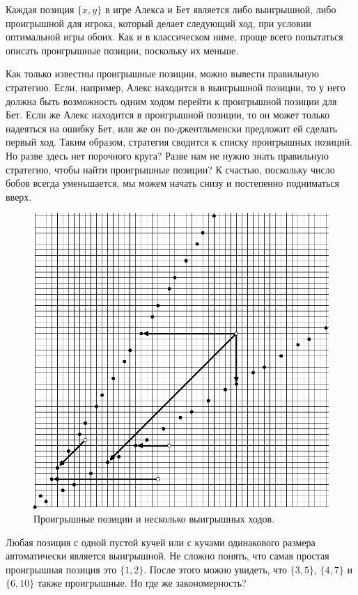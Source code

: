 Каждая позиция $\{x, y\}$ в игре Алекса и Бет является либо выигрышной, либо проигрышной для игрока, который делает следующий ход, при условии оптимальной игры обоих.
Как и в классическом ниме, проще всего попытаться описать проигрышные позиции, поскольку их меньше.

Как только известны проигрышные позиции, можно вывести правильную стратегию.
Если, например, Алекс находится в выигрышной позиции, то у него должна быть возможность одним ходом перейти к проигрышной позиции для Бет.
Если же Алекс находится в проигрышной позиции, то он может только надеяться на ошибку Бет, или же он по-джентльменски предложит ей сделать первый ход.
Таким образом, стратегия сводится к списку проигрышных позиций.
Но разве здесь нет порочного круга?
Разве нам не нужно знать правильную стратегию, чтобы найти проигрышные позиции?
К счастью, поскольку число бобов всегда уменьшается, мы можем начать снизу и постепенно подниматься вверх.

\begin{figure}[!ht]
\vskip-0mm
\centering
\includegraphics{mppics/pic-5}
\vskip-0mm
\caption{Проигрышные позиции и несколько выигрышных ходов.}
\label{pic:chess2}
\end{figure}

Любая позиция с одной пустой кучей или с кучами одинакового размера автоматически является выигрышной.
Не сложно понять, что самая простая проигрышная позиция это $\{1, 2\}$.
После этого можно увидеть, что $\{3, 5\}$, $\{4, 7\}$ и $\{6, 10\}$ также проигрышные.
Но где же закономерность?

